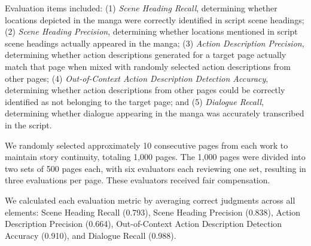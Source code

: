 Evaluation items included: (1) {\it Scene Heading Recall}, determining whether locations depicted in the manga were correctly identified in script scene headings; (2) {\it Scene Heading Precision}, determining whether locations mentioned in script scene headings actually appeared in the manga; (3) {\it Action Description Precision}, determining whether action descriptions generated for a target page actually match that page when mixed with randomly selected action descriptions from other pages; (4) {\it Out-of-Context Action Description Detection Accuracy}, determining whether action descriptions from other pages could be correctly identified as not belonging to the target page; and (5) {\it Dialogue Recall}, determining whether dialogue appearing in the manga was accurately transcribed in the script.

We randomly selected approximately 10 consecutive pages from each work to maintain story continuity, totaling 1,000 pages. The 1,000 pages were divided into two sets of 500 pages each, with six evaluators each reviewing one set, resulting in three evaluations per page. These evaluators received fair compensation.

We calculated each evaluation metric by averaging correct judgments across all elements: Scene Heading Recall (0.793), Scene Heading Precision (0.838), Action Description Precision (0.664), Out-of-Context Action Description Detection Accuracy (0.910), and Dialogue Recall (0.988).